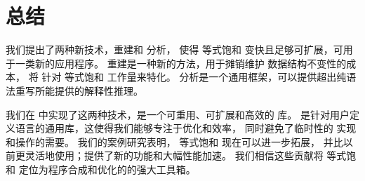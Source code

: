 \section{总结}
\label{sec:conclusion}

我们提出了两种新技术，重建和 \eclass 分析，
  使得 等式饱和 变快且足够可扩展，可用于一类新的应用程序。
重建是一种新的方法，用于摊销维护 \egraph 数据结构不变性的成本，
  将 \egraph 针对 等式饱和 工作量来特化。 %
\eclass 分析是一个通用框架，可以提供超出纯语法重写所能提供的解释性推理。

我们在 \egg 中实现了这两种技术，\egg 是一个可重用、可扩展和高效的 \egraph 库。
\Egg 是针对用户定义语言的通用库，这使得我们能够专注于优化和效率，
  同时避免了临时性的 \egraph 实现和操作的需要。 %
我们的案例研究表明， 等式饱和 现在可以进一步拓展，%
  并比以前更灵活地使用；\egg 提供了新的功能和大幅性能加速。
我们相信这些贡献将 等式饱和 定位为程序合成和优化的的强大工具箱。

